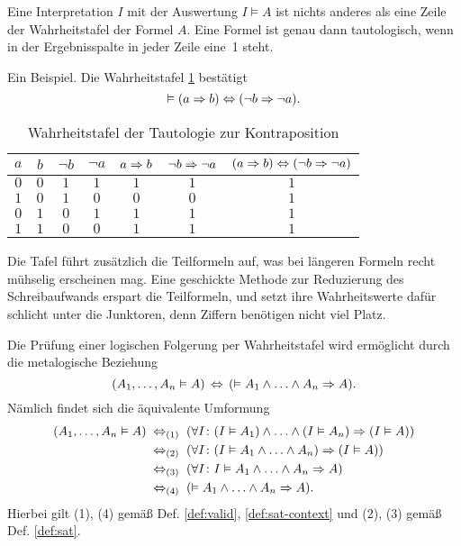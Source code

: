 Eine Interpretation $I$ mit der Auswertung $I\models A$ ist nichts
anderes als eine Zeile der Wahrheitstafel der
Formel $A$. Eine Formel ist genau dann tautologisch, wenn in der
Ergebnisspalte in jeder Zeile eine~1 steht.

Ein Beispiel. Die Wahrheitstafel \ref{tab:Tautologie-zur-Kontraposition}
bestätigt
\[\vDash (a\Rightarrow b)\Leftrightarrow (\lnot b\Rightarrow\lnot a).\]

\begin{table}
\caption{Wahrheitstafel der Tautologie zur Kontraposition}
\label{tab:Tautologie-zur-Kontraposition}
\centering
\begin{tabular}{cc@{\quad\;\;}c@{\quad\;\;}c@{\quad\;\;}c@{\quad\;\;}c@{\quad\;\;}c}
\toprule
$a$ & $b$ & $\lnot b$ & $\lnot a$ & $a\Rightarrow b$ & $\lnot b\Rightarrow\lnot a$
& $(a\Rightarrow b)\Leftrightarrow (\lnot b\Rightarrow\lnot a)$\\
\midrule[\heavyrulewidth]
$0$ & $0$ & $1$ & $1$ & $1$ & $1$ & $1$ \\
$1$ & $0$ & $1$ & $0$ & $0$ & $0$ & $1$ \\
$0$ & $1$ & $0$ & $1$ & $1$ & $1$ & $1$ \\
$1$ & $1$ & $0$ & $0$ & $1$ & $1$ & $1$ \\
\bottomrule
\end{tabular}
\end{table}

\noindent
Die Tafel führt zusätzlich die Teilformeln auf, was bei längeren
Formeln recht mühselig erscheinen mag. Eine geschickte Methode zur
Reduzierung des Schreibaufwands erspart die Teilformeln, und setzt ihre
Wahrheitswerte dafür schlicht unter die Junktoren, denn Ziffern
benötigen nicht viel Platz.

Die Prüfung einer logischen Folgerung per Wahrheitstafel
wird ermöglicht durch die metalogische Beziehung
\[(A_1,\ldots,A_n\vDash A)\,\Leftrightarrow\, (\vDash A_1\land\ldots\land A_n\Rightarrow A).\]
Nämlich findet sich die äquivalente Umformung
\begin{align*}
(A_1,\ldots,A_n\vDash A)
&\;\Leftrightarrow_{\text{(1)}}\;
(\forall I\colon (I\vDash A_1)\land\ldots\land (I\vDash A_n)\Rightarrow (I\vDash A))\\
&\;\Leftrightarrow_{\text{(2)}}\;
(\forall I\colon (I\vDash A_1\land\ldots\land A_n)\Rightarrow (I\vDash A))\\
&\;\Leftrightarrow_{\text{(3)}}\;
(\forall I\colon I\vDash A_1\land\ldots\land A_n\Rightarrow A)\\
&\;\Leftrightarrow_{\text{(4)}}\;
(\vDash A_1\land\ldots\land A_n\Rightarrow A).
\end{align*}
Hierbei gilt (1), (4) gemäß Def. \ref{def:valid}, \ref{def:sat-context}
und (2), (3) gemäß Def. \ref{def:sat}.

